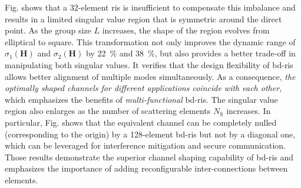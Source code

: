 \documentclass[
	fontsize=11pt,
	paper=a4,
	foldmarks=false
]{scrartcl}
\begin{document}
\begin{reviewer}
{{			Fig.  shows that a 32-element \gls{ris} is insufficient to compensate this imbalance and results in a limited singular value region that is symmetric around the direct point.
			As the group size $L$ increases, the shape of the region evolves from elliptical to square.
			This transformation not only improves the dynamic range of $\sigma_1(\mathbf{H})$ and $\sigma_2(\mathbf{H})$ by \qty{22}{\percent} and \qty{38}{\percent}, but also provides a better trade-off in manipulating both singular values.
			It verifies that the design flexibility of \gls{bd}-\gls{ris} allows better alignment of multiple modes simultaneously.
			As a consequence, \emph{the optimally shaped channels for different applications coincide with each other,} which emphasizes the benefits of \emph{multi-functional} \gls{bd}-\gls{ris}.
			The singular value region also enlarges as the number of scattering elements $N_\mathrm{S}$ increases.
			In particular, Fig.  shows that the equivalent channel can be completely nulled (corresponding to the origin) by a 128-element \gls{bd}-\gls{ris} but not by a diagonal one, which can be leveraged for interference mitigation and secure communication.
			Those results demonstrate the superior channel shaping capability of \gls{bd}-\gls{ris} and emphasizes the importance of adding reconfigurable inter-connections between elements.
		}
	}



\end{reviewer}
\end{document}
